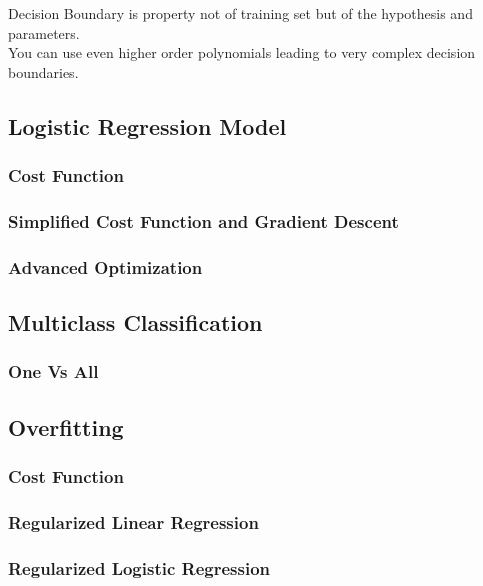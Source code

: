 Decision Boundary is property not of training set but of the hypothesis and parameters. \\

You can use even higher order polynomials leading to very complex decision boundaries.

\subsection{Logistic Regression Model}
\subsubsection{Cost Function}
\subsubsection{Simplified Cost Function and Gradient Descent}
\subsubsection{Advanced Optimization}

\subsection{Multiclass Classification}
\subsubsection{One Vs All}

\subsection{Overfitting}
\subsubsection{Cost Function}
\subsubsection{Regularized Linear Regression}
\subsubsection{Regularized Logistic Regression}


